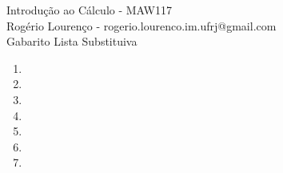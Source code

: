 \documentclass{article}
\begin{document}
\begin{flushleft}
	Introdução ao Cálculo - MAW117\\
	Rogério Lourenço - rogerio.lourenco.im.ufrj@gmail.com\\
	Gabarito Lista Substituiva
\end{flushleft}

\begin{enumerate}
	\item 
	\item 
	\item 
	\item 
	\item 
	\item 
	\item 
\end{enumerate}
\end{document}
